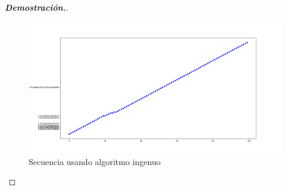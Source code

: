 \documentclass{article}
\begin{document}
\begin{enumerate}
\begin{mdframed}[
			      linecolor=darkgray,
		      ]
\begin{proof}[\textbf{Demostraci\'on.}]
			      \begin{figure}[H]
				      \caption{Secuencia usando algoritmo ingenuo}
				      \includegraphics[width=\textwidth]{naive_pi_approx}
			      \end{figure}


\end{proof}
\end{mdframed}
\end{enumerate}
\end{document}
